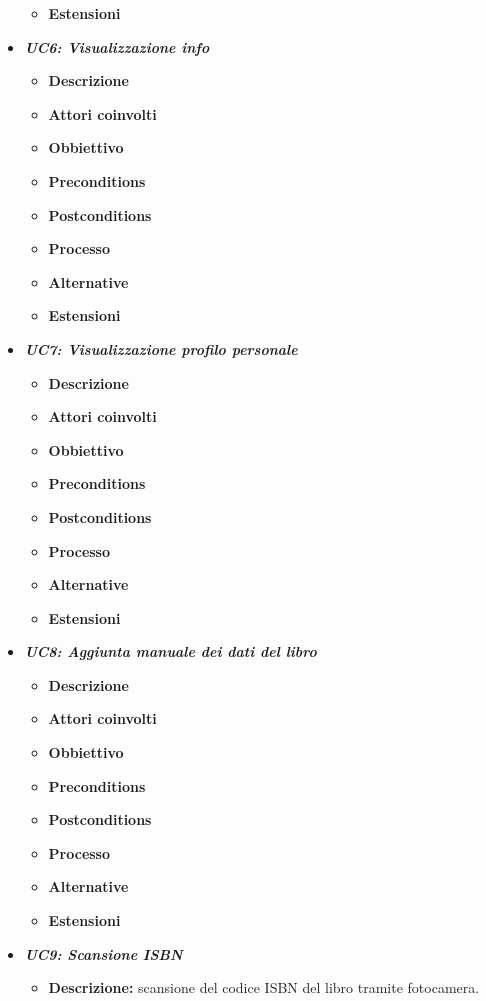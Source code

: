 \begin{itemize}
\begin{itemize}
		\item \textbf{Estensioni}
	\end{itemize}
	\item \textbf{\textit{UC6: Visualizzazione info}}
	\begin{itemize}
		\item \textbf{Descrizione}
		\item \textbf{Attori coinvolti}
		\item \textbf{Obbiettivo}
		\item \textbf{Preconditions}
		\item \textbf{Postconditions}
		\item \textbf{Processo}
		\item \textbf{Alternative}
		\item \textbf{Estensioni}
	\end{itemize}
	\item \textbf{\textit{UC7: Visualizzazione profilo personale}}
	\begin{itemize}
		\item \textbf{Descrizione}
		\item \textbf{Attori coinvolti}
		\item \textbf{Obbiettivo}
		\item \textbf{Preconditions}
		\item \textbf{Postconditions}
		\item \textbf{Processo}
		\item \textbf{Alternative}
		\item \textbf{Estensioni}
	\end{itemize}
	\item \textbf{\textit{UC8: Aggiunta manuale dei dati del libro}}
	\begin{itemize}
		\item \textbf{Descrizione}
		\item \textbf{Attori coinvolti}
		\item \textbf{Obbiettivo}
		\item \textbf{Preconditions}
		\item \textbf{Postconditions}
		\item \textbf{Processo}
		\item \textbf{Alternative}
		\item \textbf{Estensioni}
	\end{itemize}
	\item \textbf{\textit{UC9: Scansione ISBN}}
	\begin{itemize}
		\item \textbf{Descrizione:} scansione del codice ISBN del libro tramite fotocamera.

\end{itemize}
\end{itemize}

